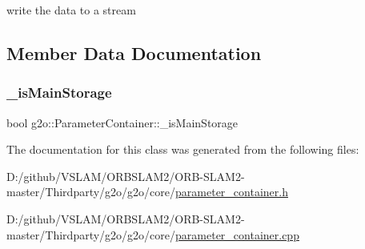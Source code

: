 write the data to a stream 



\subsection{Member Data Documentation}
\mbox{\label{classg2o_1_1_parameter_container_a2ff1e92bc6a486d48043e2191807bd47}} 
\subsubsection{\texorpdfstring{\+\_\+is\+Main\+Storage}{\_isMainStorage}}
{\footnotesize\ttfamily bool g2o\+::\+Parameter\+Container\+::\+\_\+is\+Main\+Storage\hspace{0.3cm}{\ttfamily [protected]}}



The documentation for this class was generated from the following files\+:\begin{DoxyCompactItemize}
\item 
D\+:/github/\+V\+S\+L\+A\+M/\+O\+R\+B\+S\+L\+A\+M2/\+O\+R\+B-\/\+S\+L\+A\+M2-\/master/\+Thirdparty/g2o/g2o/core/\mbox{\hyperlink{parameter__container_8h}{parameter\+\_\+container.\+h}}\item 
D\+:/github/\+V\+S\+L\+A\+M/\+O\+R\+B\+S\+L\+A\+M2/\+O\+R\+B-\/\+S\+L\+A\+M2-\/master/\+Thirdparty/g2o/g2o/core/\mbox{\hyperlink{parameter__container_8cpp}{parameter\+\_\+container.\+cpp}}\end{DoxyCompactItemize}
